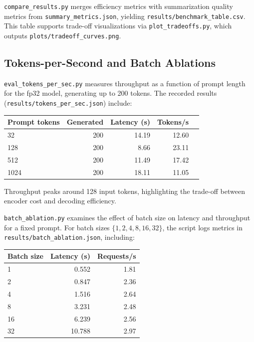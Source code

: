 \documentclass[11pt]{article}
\begin{document}
\verb|compare_results.py| merges efficiency metrics with summarization quality metrics from \verb|summary_metrics.json|, yielding \verb|results/benchmark_table.csv|. This table supports trade-off visualizations via \verb|plot_tradeoffs.py|, which outputs \verb|plots/tradeoff_curves.png|.

\subsection{Tokens-per-Second and Batch Ablations}

\verb|eval_tokens_per_sec.py| measures throughput as a function of prompt length for the fp32 model, generating up to 200 tokens. The recorded results (\verb|results/tokens_per_sec.json|) include:

\begin{center}
\begin{tabular}{lrrrr}
\toprule
Prompt tokens & Generated & Latency (s) & Tokens/s \\
\midrule
32   & 200 & 14.19 & 12.60 \\
128  & 200 & 8.66  & 23.11 \\
512  & 200 & 11.49 & 17.42 \\
1024 & 200 & 18.11 & 11.05 \\
\bottomrule
\end{tabular}
\end{center}

Throughput peaks around 128 input tokens, highlighting the trade-off between encoder cost and decoding efficiency.

\verb|batch_ablation.py| examines the effect of batch size on latency and throughput for a fixed prompt. For batch sizes $\{1,2,4,8,16,32\}$, the script logs metrics in \verb|results/batch_ablation.json|, including:

\begin{center}
\begin{tabular}{lrr}
\toprule
Batch size & Latency (s) & Requests/s \\
\midrule
1  & 0.552  & 1.81 \\
2  & 0.847  & 2.36 \\
4  & 1.516  & 2.64 \\
8  & 3.231  & 2.48 \\
16 & 6.239  & 2.56 \\
32 & 10.788 & 2.97 \\
\bottomrule
\end{tabular}
\end{center}
\end{document}
